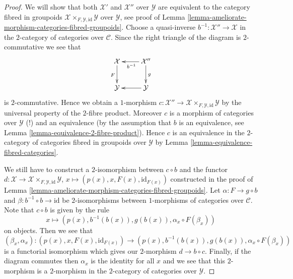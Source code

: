 \begin{proof}
We will show that both $\mathcal{X}'$ and $\mathcal{X}''$ over $\mathcal{Y}$
are equivalent to the category fibred in groupoids
$\mathcal{X} \times_{F, \mathcal{Y}, \text{id}} \mathcal{Y}$
over $\mathcal{Y}$, see proof of
Lemma \ref{lemma-ameliorate-morphism-categories-fibred-groupoids}.
Choose a quasi-inverse $b^{-1} : \mathcal{X}'' \to \mathcal{X}$ in the
$2$-category of categories over $\mathcal{C}$.
Since the right triangle of the diagram is $2$-commutative we see that
$$
\xymatrix{
\mathcal{X} \ar[d]_F & \mathcal{X}'' \ar[l]^{b^{-1}} \ar[d]^g \\
\mathcal{Y} & \mathcal{Y} \ar[l]
}
$$
is $2$-commutative. Hence we obtain a $1$-morphism
$c : \mathcal{X}'' \to
\mathcal{X} \times_{F, \mathcal{Y}, \text{id}} \mathcal{Y}$
by the universal property of the $2$-fibre product. Moreover $c$
is a morphism of categories over $\mathcal{Y}$ (!) and an equivalence
(by the assumption that $b$ is an equivalence, see
Lemma \ref{lemma-equivalence-2-fibre-product}).
Hence $c$ is an equivalence in the $2$-category of categories fibred
in groupoids over $\mathcal{Y}$ by 
Lemma \ref{lemma-equivalence-fibred-categories}.

\medskip\noindent
We still have to construct a $2$-isomorphism between $c \circ b$ and
the functor $d : \mathcal{X} \to
\mathcal{X} \times_{F, \mathcal{Y}, \text{id}} \mathcal{Y}$,
$x \mapsto (p(x), x, F(x), \text{id}_{F(x)})$
constructed in the proof of
Lemma \ref{lemma-ameliorate-morphism-categories-fibred-groupoids}.
Let $\alpha : F \to g \circ b$ and $\beta : b^{-1} \circ b \to \text{id}$
be $2$-isomorphisms between $1$-morphisms of categories over $\mathcal{C}$.
Note that $c \circ b$ is given by the rule
$$
x \mapsto (p(x), b^{-1}(b(x)), g(b(x)), \alpha_x \circ F(\beta_x))
$$
on objects. Then we see that
$$
(\beta_x, \alpha_x) :
(p(x), x, F(x), \text{id}_{F(x)})
\longrightarrow
(p(x), b^{-1}(b(x)), g(b(x)), \alpha_x \circ F(\beta_x))
$$
is a functorial isomorphism which gives our $2$-morphism
$d \to b \circ c$. Finally, if the diagram commutes then
$\alpha_x$ is the identity for all $x$ and we see that this
$2$-morphism is a $2$-morphism in the $2$-category of categories
over $\mathcal{Y}$.
\end{proof}

































